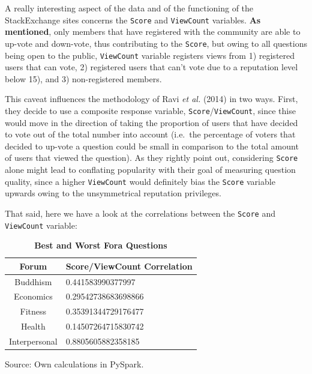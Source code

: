 \documentclass[11pt,preprint, authoryear]{article}
\numberwithin{equation}{section}
\begin{document}
A really interesting aspect of the data and of the functioning of the
StackExchange sites concerns the \texttt{Score} and \texttt{ViewCount}
variables. \textbf{As mentioned}, only members that have registered with
the community are able to up-vote and down-vote, thus contributing to
the \texttt{Score}, but owing to all questions being open to the public,
\texttt{ViewCount} variable registers views from 1) registered users
that can vote, 2) registered users that can't vote due to a reputation
level below 15), and 3) non-registered members.

This caveat influences the methodology of Ravi \emph{et al.} (2014) in
two ways. First, they decide to use a composite response variable,
\texttt{Score}/\texttt{ViewCount}, since thise would move in the
direction of taking the proportion of users that have decided to vote
out of the total number into account (i.e.~the percentage of voters that
decided to up-vote a question could be small in comparison to the total
amount of users that viewed the question). As they rightly point out,
considering \texttt{Score} alone might lead to conflating popularity
with their goal of measuring question quality, since a higher
\texttt{ViewCount} would definitely bias the \texttt{Score} variable
upwards owing to the unsymmetrical reputation privileges.

That said, here we have a look at the correlations between the
\texttt{Score} and \texttt{ViewCount} variable:

\footnotesize

\begin{longtable} {@{} cp{11cm} @{}}
\caption{\textbf{Best and Worst Fora Questions}}
\label{tab:bestworst}\\ 
\toprule
\textbf{Forum} & \textbf{Score/ViewCount Correlation} \\ 
\midrule
Buddhism & 0.441583990377997 \\
Economics & 0.29542738683698866 \\
Fitness & 0.35391344729176477 \\
Health & 0.14507264715830742 \\
Interpersonal & 0.8805605882358185 \\
\bottomrule
\end{longtable}\begin{center} Source: Own calculations in PySpark.\end{center}

\normalsize
\end{document}
